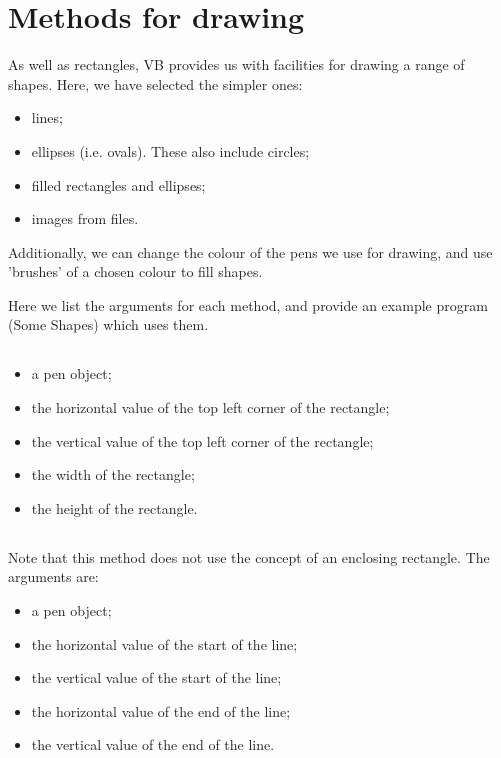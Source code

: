 	\section{Methods for drawing}
		As well as rectangles, VB provides us with facilities for drawing a range of shapes. Here, we have selected the simpler ones:
		\begin{itemize}
			\item lines;
			\item ellipses (i.e. ovals). These also include circles;
			\item filled rectangles and ellipses;
			\item images from files.
		\end{itemize}
		Additionally, we can change the colour of the pens we use for drawing, and use 'brushes' of a chosen colour to fill shapes.

		Here we list the arguments for each method, and provide an example program (Some Shapes) which uses them.
		\subsection*{}
			\begin{itemize}
				\item a pen object;
				\item the horizontal value of the top left corner of the rectangle;
				\item the vertical value of the top left corner of the rectangle;
				\item the width of the rectangle;
				\item the height of the rectangle.
			\end{itemize}

		\subsection*{}
			Note that this method does not use the concept of an enclosing rectangle. The arguments are:
			\begin{itemize}
				\item a pen object;
				\item the horizontal value of the start of the line;
				\item the vertical value of the start of the line;
				\item the horizontal value of the end of the line;
				\item the vertical value of the end of the line.
			\end{itemize}
		
